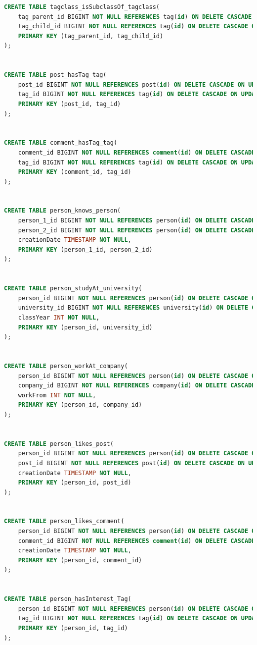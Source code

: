 \begin{lstlisting}[language=sql]
CREATE TABLE tagclass_isSubclassOf_tagclass(
    tag_parent_id BIGINT NOT NULL REFERENCES tag(id) ON DELETE CASCADE ON UPDATE CASCADE,
    tag_child_id BIGINT NOT NULL REFERENCES tag(id) ON DELETE CASCADE ON UPDATE CASCADE,
    PRIMARY KEY (tag_parent_id, tag_child_id)
);


CREATE TABLE post_hasTag_tag(
    post_id BIGINT NOT NULL REFERENCES post(id) ON DELETE CASCADE ON UPDATE CASCADE,
    tag_id BIGINT NOT NULL REFERENCES tag(id) ON DELETE CASCADE ON UPDATE CASCADE,
    PRIMARY KEY (post_id, tag_id)
);


CREATE TABLE comment_hasTag_tag(
    comment_id BIGINT NOT NULL REFERENCES comment(id) ON DELETE CASCADE ON UPDATE CASCADE,
    tag_id BIGINT NOT NULL REFERENCES tag(id) ON DELETE CASCADE ON UPDATE CASCADE,
    PRIMARY KEY (comment_id, tag_id)
);


CREATE TABLE person_knows_person(
    person_1_id BIGINT NOT NULL REFERENCES person(id) ON DELETE CASCADE ON UPDATE CASCADE,
    person_2_id BIGINT NOT NULL REFERENCES person(id) ON DELETE CASCADE ON UPDATE CASCADE,
    creationDate TIMESTAMP NOT NULL,
    PRIMARY KEY (person_1_id, person_2_id)
);


CREATE TABLE person_studyAt_university(
    person_id BIGINT NOT NULL REFERENCES person(id) ON DELETE CASCADE ON UPDATE CASCADE,
    university_id BIGINT NOT NULL REFERENCES university(id) ON DELETE CASCADE ON UPDATE CASCADE,
    classYear INT NOT NULL,
    PRIMARY KEY (person_id, university_id)
);


CREATE TABLE person_workAt_company(
    person_id BIGINT NOT NULL REFERENCES person(id) ON DELETE CASCADE ON UPDATE CASCADE,
    company_id BIGINT NOT NULL REFERENCES company(id) ON DELETE CASCADE ON UPDATE CASCADE,
    workFrom INT NOT NULL,
    PRIMARY KEY (person_id, company_id)
);


CREATE TABLE person_likes_post(
    person_id BIGINT NOT NULL REFERENCES person(id) ON DELETE CASCADE ON UPDATE CASCADE,
    post_id BIGINT NOT NULL REFERENCES post(id) ON DELETE CASCADE ON UPDATE CASCADE,
    creationDate TIMESTAMP NOT NULL,
    PRIMARY KEY (person_id, post_id)
);


CREATE TABLE person_likes_comment(
    person_id BIGINT NOT NULL REFERENCES person(id) ON DELETE CASCADE ON UPDATE CASCADE,
    comment_id BIGINT NOT NULL REFERENCES comment(id) ON DELETE CASCADE ON UPDATE CASCADE,
    creationDate TIMESTAMP NOT NULL,
    PRIMARY KEY (person_id, comment_id)
);


CREATE TABLE person_hasInterest_Tag(
    person_id BIGINT NOT NULL REFERENCES person(id) ON DELETE CASCADE ON UPDATE CASCADE,
    tag_id BIGINT NOT NULL REFERENCES tag(id) ON DELETE CASCADE ON UPDATE CASCADE,
    PRIMARY KEY (person_id, tag_id)
);


\end{lstlisting}

